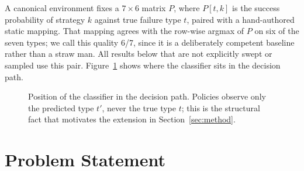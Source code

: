 \documentclass[conference]{IEEEtran}
\begin{document}
A canonical environment fixes a $7 \times 6$ matrix $P$, where $P[t,k]$ is
the success probability of strategy $k$ against true failure type $t$,
paired with a hand-authored static mapping. That mapping agrees with the
row-wise argmax of $P$ on six of the seven types; we call this quality
6/7, since it is a deliberately competent baseline rather than a straw
man. All results below that are not explicitly swept or sampled use this
pair. Figure~\ref{fig:framework} shows where the classifier sits in the
decision path.

\begin{figure}[t]
\centering
{}
\caption{Position of the classifier in the decision path. Policies observe
only the predicted type $t'$, never the true type $t$; this is the
structural fact that motivates the extension in Section~\ref{sec:method}.}
\label{fig:framework}
\end{figure}

\section{Problem Statement}
\end{document}
